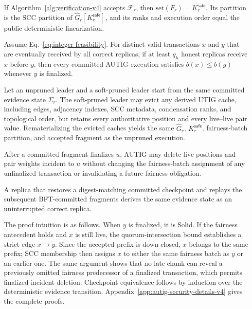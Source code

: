 \begin{theorem}
\label{thm:safe-fragment-v4}
If Algorithm~\ref{alg:verification-v4} accepts $\mathcal F_r$, then
$\mathrm{set}(F_r)=K_r^{\mathsf{safe}}$.  Its partition is the SCC partition
of $\widehat G_r[K_r^{\mathsf{safe}}]$, and its ranks and execution order equal
the public deterministic linearization.
\end{theorem}

\begin{theorem}
\label{thm:batch-fairness-v4}
Assume Eq.~\eqref{eq:integer-feasibility}.  For distinct valid transactions
$x$ and $y$ that are eventually received by all correct replicas, if at least
$q_h$ honest replicas receive $x$ before $y$, then every committed AUTIG
execution satisfies $b(x)\le b(y)$ whenever $y$ is finalized.
\end{theorem}

\begin{theorem}
\label{thm:pruning_safety}
Let an unpruned leader and a soft-pruned leader start from the same committed
evidence state $\Sigma_r$.  The soft-pruned leader may evict any derived UTIG
cache, including edges, adjacency indexes, SCC metadata, condensation ranks,
and topological order, but retains every authoritative position and every
live--live pair value.  Rematerializing the evicted caches yields the same
$\widehat G_r$, $K_r^{\mathsf{safe}}$, fairness-batch partition, and accepted
fragment as the unpruned execution.
\end{theorem}

\begin{theorem}
\label{thm:hard-deletion-v4}
After a committed fragment finalizes $u$, AUTIG may delete live positions and
pair weights incident to $u$ without changing the fairness-batch assignment
of any unfinalized transaction or invalidating a future fairness obligation.
\end{theorem}

\begin{theorem}
\label{thm:recovery-v4}
A replica that restores a digest-matching committed checkpoint and replays the
subsequent BFT-committed fragments derives the same evidence state as an
uninterrupted correct replica.
\end{theorem}

The proof intuition is as follows.  When $y$ is finalized, it is Solid.  If
the fairness antecedent holds and $x$ is still live, the quorum-intersection
bound establishes a strict edge $x\to y$.  Since the accepted prefix is
down-closed, $x$ belongs to the same prefix; SCC membership then assigns $x$
to either the same fairness batch as $y$ or an earlier one.  The same argument
shows that no late chunk can reveal a previously omitted fairness predecessor
of a finalized transaction, which permits finalized-incident deletion.
Checkpoint equivalence follows by induction over the deterministic evidence
transition.  Appendix~\ref{app:autig-security-details-v4} gives the complete
proofs.

